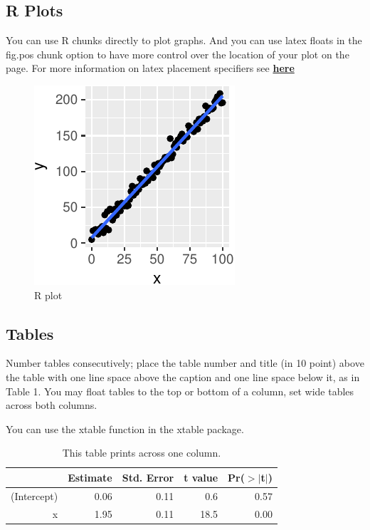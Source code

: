 \documentclass[10pt, letterpaper]{article}
\newenvironment{CodeChunk}{}{}
\begin{document}
\subsection{R Plots}\label{r-plots}

You can use R chunks directly to plot graphs. And you can use latex
floats in the fig.pos chunk option to have more control over the
location of your plot on the page. For more information on latex
placement specifiers see
\textbf{\href{https://en.wikibooks.org/wiki/LaTeX/Floats,_Figures_and_Captions}{here}}

\begin{CodeChunk}
\begin{figure}[H]

{\centering \includegraphics{figs/plot-1} 

}

\caption[R plot]{R plot}\label{fig:plot}
\end{figure}
\end{CodeChunk}

\subsection{Tables}\label{tables}

Number tables consecutively; place the table number and title (in 10
point) above the table with one line space above the caption and one
line space below it, as in Table 1. You may float tables to the top or
bottom of a column, set wide tables across both columns.

You can use the xtable function in the xtable package.

\begin{table}[H]
\centering
\begin{tabular}{rrrrr}
  \hline
 & Estimate & Std. Error & t value & Pr($>$$|$t$|$) \\ 
  \hline
(Intercept) & 0.06 & 0.11 & 0.6 & 0.57 \\ 
  x & 1.95 & 0.11 & 18.5 & 0.00 \\ 
   \hline
\end{tabular}
\caption{This table prints across one column.} 
\end{table}
\end{document}

